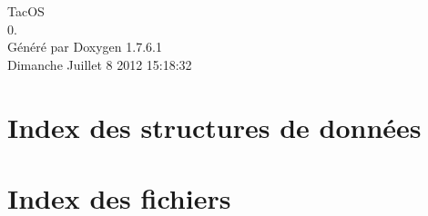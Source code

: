 \documentclass[a4paper]{book}
\begin{document}
\hypersetup{pageanchor=false,citecolor=blue}
\begin{titlepage}
\vspace*{7cm}
\begin{center}
{\Large \-Tac\-O\-S \\[1ex]\large 0. }\\
\vspace*{1cm}
{\large \-Généré par Doxygen 1.7.6.1}\\
\vspace*{0.5cm}
{\small Dimanche Juillet 8 2012 15:18:32}\\
\end{center}
\end{titlepage}
\clearemptydoublepage
{}
\tableofcontents
\clearemptydoublepage
{}
\hypersetup{pageanchor=true,citecolor=blue}
\chapter{\-Index des structures de données}

\chapter{\-Index des fichiers}

\end{document}
